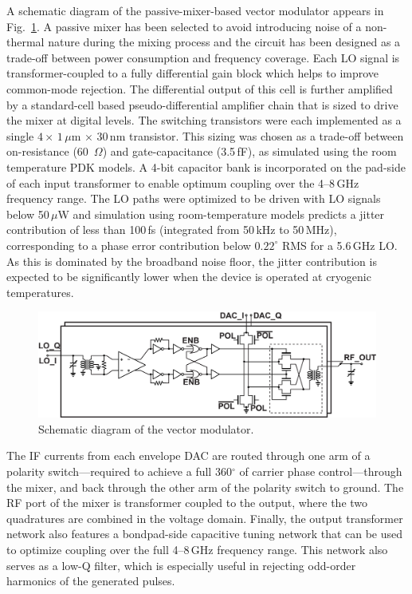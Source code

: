 \documentclass[journal]{IEEEtran}
\newcommand{\CR}[1]{{\color{black}#1}}
\begin{document}
A schematic diagram of the passive-mixer-based vector modulator appears in Fig.~\ref{vectormod}. A passive mixer has been selected to avoid introducing noise of a non-thermal nature during the mixing process and the circuit has been designed as a trade-off between power consumption and \CR{frequency coverage}. Each LO signal is transformer-coupled to a fully differential gain block which helps to improve common-mode rejection.  The differential output of this cell is further amplified by a standard-cell based pseudo-differential amplifier chain that is sized to drive the mixer \CR{at digital levels. The switching transistors were each implemented as a single $4\times\,1\,\mu$m$\,\times\,30\,$nm transistor. This sizing was chosen as a trade-off between on-resistance (60~$\Omega$) and gate-capacitance (3.5\,fF), as simulated using the room temperature PDK models.} \CR{A 4-bit capacitor bank is incorporated on the pad-side of each input transformer to enable optimum coupling over the 4--8\,GHz frequency range.} \CR{The LO paths were optimized to be driven with LO signals below 50\,$\mu$W and  simulation using room-temperature models predicts a jitter contribution of less than 100\,fs (integrated from 50\,kHz to 50\,MHz), corresponding to a phase error contribution below $0.22^\circ$ RMS for a 5.6\,GHz LO. As this is dominated by the broadband noise floor, the jitter contribution is expected to be significantly lower when the device is operated at cryogenic temperatures}. 
\begin{figure}[bt!] 
\includegraphics[width=\columnwidth]{Figures/FIGURE_10}
\caption{Schematic diagram of the vector modulator.}\label{vectormod}
\end{figure}

The IF currents from each envelope DAC are routed through one arm of a polarity switch---required to achieve a full 360$^\circ$ of carrier phase control---through the mixer, and back through the other arm of the polarity switch to ground. The \CR{RF port} of the mixer is transformer coupled to the output, where the two quadratures are combined in the voltage domain. Finally,  \CR{the output transformer network} also features a bondpad-side capacitive tuning network that can be used to optimize coupling over the full 4--8\,GHz frequency range. \CR{This network also serves as a low-Q filter, which is especially useful in rejecting odd-order harmonics of the generated pulses.}
\end{document}

